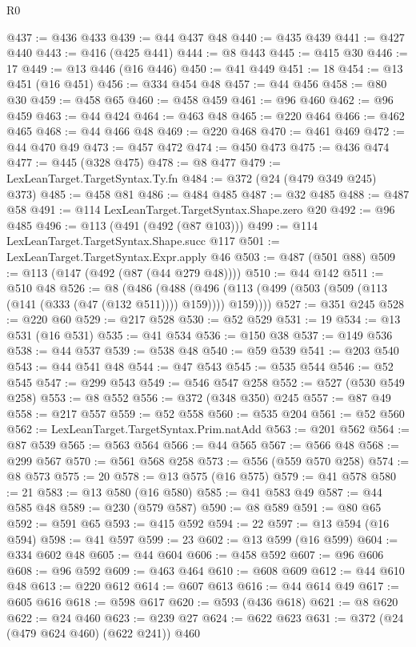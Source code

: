 \begin{lexlean}{R0}
\begin{coremodule}
{{{{{{{{{{{{{{{{{{{{{{{{{{{{{{{{{{{{{{{{{{{{{{{{{{{{{{{{{{{{{{{{{{{{{{{{{@437 := @436 @433
@439 := @44 @437 @48
@440 := @435 @439
@441 := @427 @440
@443 := @416 (@425 @441)
@444 := @8 @443
@445 := @415 @30
@446 := 17
@449 := @13 @446 (@16 @446)
@450 := @41 @449
@451 := 18
@454 := @13 @451 (@16 @451)
@456 := @334 @454 @48
@457 := @44 @456
@458 := @80 @30
@459 := @458 @65
@460 := @458 @459
@461 := @96 @460
@462 := @96 @459
@463 := @44 @424
@464 := @463 @48
@465 := @220 @464
@466 := @462 @465
@468 := @44 @466 @48
@469 := @220 @468
@470 := @461 @469
@472 := @44 @470 @49
@473 := @457 @472
@474 := @450 @473
@475 := @436 @474
@477 := @445 (@328 @475)
@478 := @8 @477
@479 := LexLeanTarget.TargetSyntax.Ty.fn
@484 := @372 (@24 (@479 @349 @245) @373)
@485 := @458 @81
@486 := @484 @485
@487 := @32 @485
@488 := @487 @58
@491 := @114 LexLeanTarget.TargetSyntax.Shape.zero @20
@492 := @96 @485
@496 := @113 (@491 (@492 (@87 @103)))
@499 := @114 LexLeanTarget.TargetSyntax.Shape.succ @117
@501 := LexLeanTarget.TargetSyntax.Expr.apply @46
@503 := @487 (@501 @88)
@509 := @113 (@147 (@492 (@87 (@44 @279 @48))))
@510 := @44 @142
@511 := @510 @48
@526 := @8
    (@486
      (@488 (@496 (@113 (@499 (@503 (@509 (@113 (@141 (@333 (@47 (@132 @511)))) @159)))) @159))))
@527 := @351 @245
@528 := @220 @60
@529 := @217 @528
@530 := @52 @529
@531 := 19
@534 := @13 @531 (@16 @531)
@535 := @41 @534
@536 := @150 @38
@537 := @149 @536
@538 := @44 @537
@539 := @538 @48
@540 := @59 @539
@541 := @203 @540
@543 := @44 @541 @48
@544 := @47 @543
@545 := @535 @544
@546 := @52 @545
@547 := @299 @543
@549 := @546 @547 @258
@552 := @527 (@530 @549 @258)
@553 := @8 @552
@556 := @372 (@348 @350) @245
@557 := @87 @49
@558 := @217 @557
@559 := @52 @558
@560 := @535 @204
@561 := @52 @560
@562 := LexLeanTarget.TargetSyntax.Prim.natAdd
@563 := @201 @562
@564 := @87 @539
@565 := @563 @564
@566 := @44 @565
@567 := @566 @48
@568 := @299 @567
@570 := @561 @568 @258
@573 := @556 (@559 @570 @258)
@574 := @8 @573
@575 := 20
@578 := @13 @575 (@16 @575)
@579 := @41 @578
@580 := 21
@583 := @13 @580 (@16 @580)
@585 := @41 @583 @49
@587 := @44 @585 @48
@589 := @230 (@579 @587)
@590 := @8 @589
@591 := @80 @65
@592 := @591 @65
@593 := @415 @592
@594 := 22
@597 := @13 @594 (@16 @594)
@598 := @41 @597
@599 := 23
@602 := @13 @599 (@16 @599)
@604 := @334 @602 @48
@605 := @44 @604
@606 := @458 @592
@607 := @96 @606
@608 := @96 @592
@609 := @463 @464
@610 := @608 @609
@612 := @44 @610 @48
@613 := @220 @612
@614 := @607 @613
@616 := @44 @614 @49
@617 := @605 @616
@618 := @598 @617
@620 := @593 (@436 @618)
@621 := @8 @620
@622 := @24 @460
@623 := @239 @27
@624 := @622 @623
@631 := @372 (@24 (@479 @624 @460) (@622 @241)) @460
}}}}}}}}}}}}}}}}}}}}}}}}}}}}}}}}}}}}}}}}}}}}}}}}}}}}}}}}}}}}}}}}}}}}}}}}}
\end{coremodule}
\end{lexlean}
